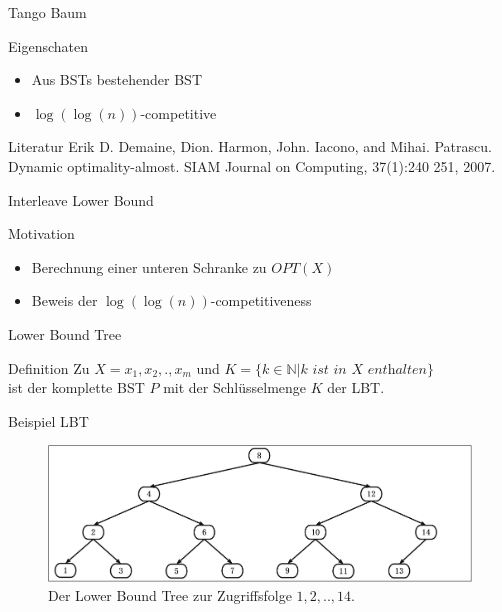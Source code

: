\documentclass[11pt]{beamer}
\begin{document}
 \begin{frame} {Tango Baum} 
 	\begin{block}{Eigenschaten}
 		\begin{itemize}
 			\item 	Aus BSTs bestehender BST
 			\item $\log\left(\log\left(n\right)\right)$-competitive		
 		\end{itemize}
    \end{block}
	\begin{block}{Literatur}
	Erik D. Demaine, Dion. Harmon, John. Iacono, and Mihai. Patrascu.
	Dynamic optimality-almost. SIAM Journal on Computing, 37(1):240
	251, 2007.
    \end{block}
\end{frame}	  
 \begin{frame} {Interleave Lower Bound} 
 	\begin{block}{Motivation}
 	\begin{itemize}
 		\item Berechnung einer unteren Schranke zu $\mathit{OPT\left(X\right)}$
 		\item Beweis der $\log\left( \log \left(n\right)\right)$-competitiveness	
 	\end{itemize}
     \end{block}
\end{frame}	  

 \begin{frame} {Lower Bound Tree} 
	\begin{block}{Definition}
		  Zu $X = x_1,x_2,.,x_m$ und $K = \{k \in \mathbb{N} \vert k \textit{ ist in $X$ enthalten}\}$\\
		  \pause
		  ist der komplette BST $P$ mit der Schlüsselmenge $K$ der LBT. 
		 
	\end{block}
\end{frame}

\begin{frame} {Beispiel LBT} 
\begin{figure}[H]
	\centering
	\includegraphics[width=1\textwidth]{Medien/pres/lowerBoundTree}
	\caption{Der Lower Bound Tree zur Zugriffsfolge $1 ,2, .., 14$.  }
	\label{fig:demlowerBoundTree}
\end{figure}
\end{frame}		
\end{document}
